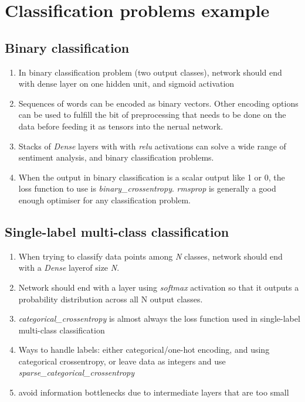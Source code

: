 \documentclass[12pt, a4paper]{article}
\begin{document}
\section{Classification problems example}

\subsection{Binary classification}
\begin{enumerate}
   \item In binary classification problem (two output classes), network should
   end with dense layer on one hidden unit, and sigmoid activation
   \item Sequences of words can be encoded as binary vectors. Other encoding
   options can be used to fulfill the bit of preprocessing that needs to be done
   on the data before feeding it as tensors into the nerual network.
   \item Stacks of \textit{Dense} layers with with \textit{relu}
   activations can solve a wide range of sentiment analysis, and binary classification problems.
   \item When the output in binary classification is a scalar output like 1 or 0,
   the loss function to use is \textit{binary\_crossentropy}. 
   \textit{rmsprop} is generally a good enough optimiser for any classification problem.
\end{enumerate}

\subsection{Single-label multi-class classification}
\begin{enumerate}
   \item When trying to classify data points among \textit{N} classes,
   network should end with a \textit{Dense} layerof size \textit{N}.
   \item Network should end with a layer using \textit{softmax} activation
   so that it outputs a probability distribution across all N output classes.
   \item \textit{categorical\_crossentropy} is almost always the loss function used
   in single-label multi-class classification
   \item Ways to handle labels: either categorical/one-hot encoding, and using categorical crossentropy,
   or leave data as integers and use \textit{sparse\_categorical\_crossentropy}
   \item avoid information bottlenecks due to intermediate layers that are too small 
\end{enumerate}
\end{document}
